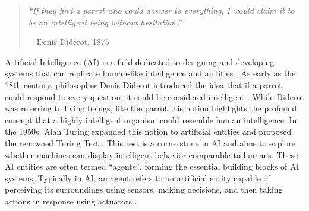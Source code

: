 \documentclass{article}
\begin{document}
\begin{quote}
\textit{``If they find a parrot who could answer to everything, I would claim it to be an intelligent being without hesitation.''}

\hspace*{\fill}---Denis Diderot, 1875
\end{quote}

Artificial Intelligence (AI) is a field dedicated to designing and developing systems that can replicate human-like intelligence and abilities \cite{russell2010artificial}.
As early as the 18th century, philosopher Denis Diderot introduced the idea that if a parrot could respond to every question, it could be considered intelligent \cite{diderot1911diderot}. 
While Diderot was referring to living beings, like the parrot, his notion highlights the profound concept that a highly intelligent organism could resemble human intelligence.
In the 1950s, Alan Turing expanded this notion to artificial entities and proposed the renowned Turing Test  \cite{turing2009computing}. This test is a cornerstone in AI and aims to explore whether machines can display intelligent behavior comparable to humans. These AI entities are often termed ``agents'', forming the essential building blocks of AI systems.
Typically in AI, an agent refers to an artificial entity capable of perceiving its surroundings using sensors, making decisions, and then taking actions in response using actuators \cite{russell2010artificial,DBLP:journals/ker/WooldridgeJ95}.

\end{document}
